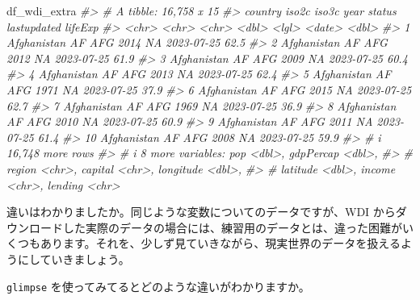 \documentclass[
  xelatex, ja=standard]{bxjsbook}
\newenvironment{Shaded}{\begin{snugshade}}{\end{snugshade}}
\newcommand{\CommentTok}[1]{\textcolor[rgb]{0.56,0.35,0.01}{\textit{#1}}}
\newcommand{\NormalTok}[1]{#1}
\theoremstyle{definition}
\theoremstyle{definition}
\theoremstyle{definition}
\theoremstyle{definition}
\theoremstyle{remark}
\begin{document}
\begin{Shaded}
\begin{Highlighting}[]
\NormalTok{df\_wdi\_extra}
\CommentTok{\#\textgreater{} \# A tibble: 16,758 x 15}
\CommentTok{\#\textgreater{}    country     iso2c iso3c  year status lastupdated lifeExp}
\CommentTok{\#\textgreater{}    \textless{}chr\textgreater{}       \textless{}chr\textgreater{} \textless{}chr\textgreater{} \textless{}dbl\textgreater{} \textless{}lgl\textgreater{}  \textless{}date\textgreater{}        \textless{}dbl\textgreater{}}
\CommentTok{\#\textgreater{}  1 Afghanistan AF    AFG    2014 NA     2023{-}07{-}25     62.5}
\CommentTok{\#\textgreater{}  2 Afghanistan AF    AFG    2012 NA     2023{-}07{-}25     61.9}
\CommentTok{\#\textgreater{}  3 Afghanistan AF    AFG    2009 NA     2023{-}07{-}25     60.4}
\CommentTok{\#\textgreater{}  4 Afghanistan AF    AFG    2013 NA     2023{-}07{-}25     62.4}
\CommentTok{\#\textgreater{}  5 Afghanistan AF    AFG    1971 NA     2023{-}07{-}25     37.9}
\CommentTok{\#\textgreater{}  6 Afghanistan AF    AFG    2015 NA     2023{-}07{-}25     62.7}
\CommentTok{\#\textgreater{}  7 Afghanistan AF    AFG    1969 NA     2023{-}07{-}25     36.9}
\CommentTok{\#\textgreater{}  8 Afghanistan AF    AFG    2010 NA     2023{-}07{-}25     60.9}
\CommentTok{\#\textgreater{}  9 Afghanistan AF    AFG    2011 NA     2023{-}07{-}25     61.4}
\CommentTok{\#\textgreater{} 10 Afghanistan AF    AFG    2008 NA     2023{-}07{-}25     59.9}
\CommentTok{\#\textgreater{} \# i 16,748 more rows}
\CommentTok{\#\textgreater{} \# i 8 more variables: pop \textless{}dbl\textgreater{}, gdpPercap \textless{}dbl\textgreater{},}
\CommentTok{\#\textgreater{} \#   region \textless{}chr\textgreater{}, capital \textless{}chr\textgreater{}, longitude \textless{}dbl\textgreater{},}
\CommentTok{\#\textgreater{} \#   latitude \textless{}dbl\textgreater{}, income \textless{}chr\textgreater{}, lending \textless{}chr\textgreater{}}
\end{Highlighting}
\end{Shaded}

違いはわかりましたか。同じような変数についてのデータですが、WDI からダウンロードした実際のデータの場合には、練習用のデータとは、違った困難がいくつもあります。それを、少しず見ていきながら、現実世界のデータを扱えるようにしていきましょう。

\texttt{glimpse} を使ってみてるとどのような違いがわかりますか。
\end{document}

